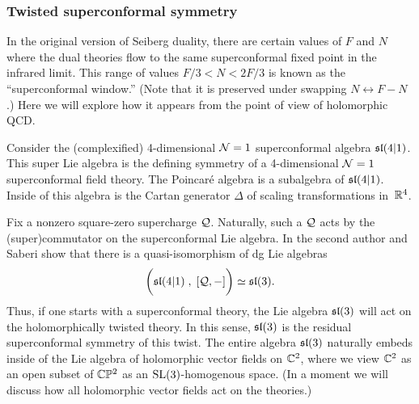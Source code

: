 \documentclass[11pt]{amsart}
\def\SU{{\rm SU}}
\begin{document}
\subsubsection{Twisted superconformal symmetry}

In the original version of Seiberg duality, there are certain values of $F$ and $N$ where the dual theories flow to the same superconformal fixed point in the infrared limit. 
This range of values $F/3 < N < 2F/3$ is known as the ``superconformal window.''
(Note that it is preserved under swapping $N \leftrightarrow F-N$.)
Here we will explore how it appears from the point of view of holomorphic QCD. 

Consider the (complexified) 4-dimensional $\cN=1$ superconformal algebra $\sl(4|1)$.
This super Lie algebra is the defining symmetry of a 4-dimensional $\cN=1$ superconformal field theory. 
The Poincar\'{e} algebra is a subalgebra of $\sl(4|1)$. %
Inside of this algebra is the Cartan generator $\Delta$ of scaling transformations in~$\RR^4$.

Fix a nonzero square-zero supercharge $\cQ$. 
Naturally, such a $\cQ$ acts by the (super)commutator on the superconformal Lie algebra.
In \cite{SWsuco} the second author and Saberi show that there is a quasi-isomorphism of dg Lie algebras
\[
\bigg(\sl(4|1) \; , \; [\cQ, -] \bigg) \simeq \sl(3) .
\]
Thus, if one starts with a superconformal theory, the Lie algebra $\sl(3)$ will act on the holomorphically twisted theory.  
In this sense, $\sl(3)$ is the residual superconformal symmetry of this twist. 
The entire algebra $\sl(3)$ naturally embeds inside of the Lie algebra of holomorphic vector fields on $\CC^2$,
where we view $\CC^2$ as an open subset of $\CC \PP^2$ as an ${\rm SL}(3)$-homogenous space.
(In a moment we will discuss how all holomorphic vector fields act on the theories.)
\end{document}
